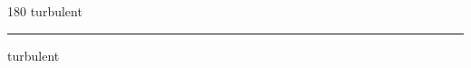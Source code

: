
\begin{frame}
\begin{center}
\begin{turn}{180}
{\fontsize{2.5cm}{1em}\selectfont turbulent}
\end{turn}
\vspace{1em}\par  
\hrule
\vspace{1em}\par  
{\fontsize{2.5cm}{1em}\selectfont turbulent}
\end{center}
\end{frame}
